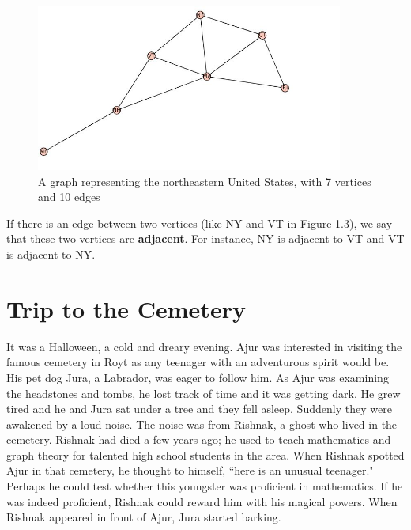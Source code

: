 \documentclass[ebook,12pt,oneside,openany]{memoir}
\begin{document}
\begin{figure}
\includegraphics[width=0.9\textwidth]{example3.JPG}
\caption{A graph representing the northeastern United States, with 7 vertices and 10 edges}
\end{figure}
\begin{newpage}
\end{newpage}

If there is an edge between two vertices (like NY and VT in Figure 1.3), we say that these two vertices are \textbf{adjacent}. For instance, NY is adjacent to VT and VT is adjacent to NY.

   

\chapter{Trip to the Cemetery}
It was a Halloween, a cold and dreary evening. Ajur was interested in visiting the famous cemetery in Royt as any teenager with an adventurous spirit would be. His pet dog Jura, a Labrador, was eager to follow him. As Ajur was examining the headstones and tombs, he lost track of time and it was getting dark. He grew tired and he and Jura sat under a tree and they fell asleep. Suddenly they were awakened by a loud noise. The noise was from Rishnak, a ghost who lived in the cemetery. Rishnak had died a few years ago; he used to teach mathematics and graph theory for talented high school students in the area. When Rishnak spotted Ajur in that cemetery, he thought to himself, ``here is an unusual teenager." Perhaps he could test whether this youngster  was proficient in mathematics. If he was indeed proficient, Rishnak could reward him with his magical powers. When Rishnak appeared in front of Ajur, Jura started barking.  
\end{document}

